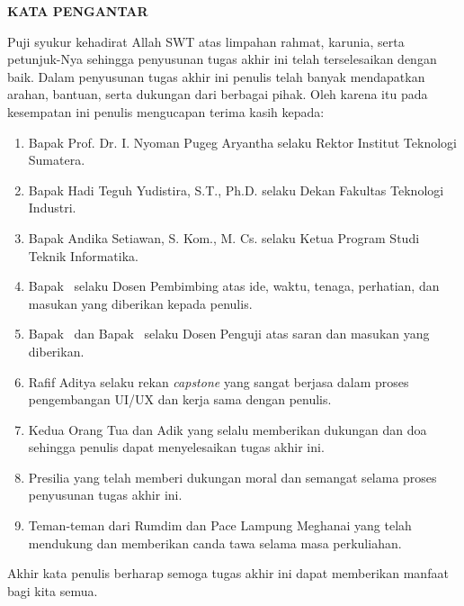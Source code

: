 \clearpage
{}%

\begin{justifying}
	\large \bfseries \centering \MakeUppercase{Kata Pengantar}\linebreak
	
	\normalsize \normalfont \justifying
	Puji syukur kehadirat Allah SWT atas limpahan rahmat, karunia, serta petunjuk-Nya sehingga penyusunan tugas akhir ini telah terselesaikan dengan baik. Dalam penyusunan tugas akhir ini penulis telah banyak mendapatkan arahan, bantuan, serta dukungan dari berbagai pihak. Oleh karena itu pada kesempatan ini penulis mengucapan terima kasih kepada: \par
	\begin{enumerate}
		\item Bapak Prof. Dr. I. Nyoman Pugeg Aryantha selaku Rektor Institut Teknologi Sumatera.  
		\item Bapak Hadi Teguh Yudistira, S.T., Ph.D. selaku Dekan Fakultas Teknologi Industri.
		\item Bapak Andika Setiawan, S. Kom., M. Cs. selaku Ketua Program Studi Teknik Informatika.
		\item Bapak \printnamadosbinga\ selaku Dosen Pembimbing atas ide, waktu, tenaga, perhatian, dan masukan yang diberikan kepada penulis.
        \item Bapak \printnamapengujia\ dan Bapak \printnamapengujib\ selaku Dosen Penguji atas saran dan masukan yang diberikan. 
		\item Rafif Aditya selaku rekan \textit {capstone} yang sangat berjasa dalam proses pengembangan UI/UX dan kerja sama dengan penulis.
		\item Kedua Orang Tua dan Adik yang selalu memberikan dukungan dan doa sehingga penulis dapat menyelesaikan tugas akhir ini.
		\item Presilia yang telah memberi dukungan moral dan semangat selama proses penyusunan tugas akhir ini.
		\item Teman-teman dari Rumdim dan Pace Lampung Meghanai yang telah mendukung dan memberikan canda tawa selama masa perkuliahan. 
	\end{enumerate} \par
	Akhir kata penulis berharap semoga tugas akhir ini dapat memberikan manfaat bagi kita semua.
	\vfill
	
\end{justifying}
\clearpage
